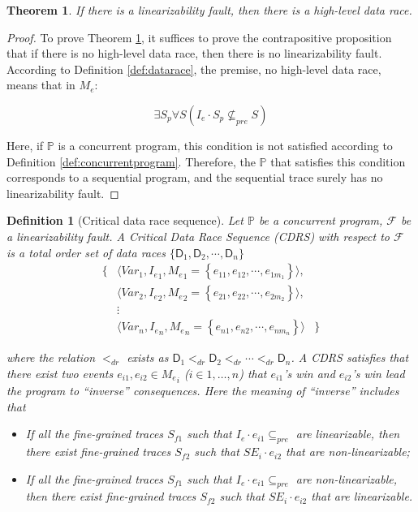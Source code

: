 \documentclass[runningheads]{llncs}
\newcommand{\set}[1]{\left\{{#1}\right\}}
\newcommand{\se}{\mathit{I_e}}
\newcommand{\ce}{\mathit{M_e}}
\newcommand{\dr}{\mathsf{D}}
\newtheorem{myTheo}{Theorem}
\newtheorem{myDef}{Definition}
\begin{document}
\begin{myTheo}\label{theo:datarace}
   If there is a linearizability fault, then there is a high-level data race.
\end{myTheo}

\begin{proof}
To prove Theorem \ref{theo:datarace}, it suffices to prove the contrapositive proposition that if there is no high-level data race, 
then there is no linearizability fault. According to Definition \ref{def:datarace}, the premise, no high-level data race, means that in $\ce$:

$$\exists S_p \forall S ( \se\cdot S_p \nsubseteq_{pre} S)$$

Here, if $\mathbb{P}$ is a concurrent program, this condition is not satisfied according to Definition \ref{def:concurrentprogram}. 
Therefore, the $\mathbb{P}$ that satisfies this condition corresponds to a sequential program, and the sequential trace surely has no linearizability fault.
\end{proof}


\begin{myDef}[Critical data race sequence]\label{def:cdrs}
    Let  $\mathbb{P}$ be a concurrent program, $\mathcal{F}$ be a linearizability fault. A \textit{Critical Data Race Sequence} (\textit{CDRS}) with respect to
 $\mathcal{F}$ is a total order set of data races $\{\mathsf{D}_1,\mathsf{D}_2,\cdots,\mathsf{D}_n\}$
 \[
\begin{array}{ccc}
   \{& \langle\mathit{Var}_1, \se_1, \ce_1 = \set{e_{11},e_{12},\cdots,e_{1m_1}}\rangle, & \\
   & \langle\mathit{Var}_2, \se_2, \ce_2 = \set{e_{21},e_{22},\cdots,e_{2m_2}}\rangle, &\\
   & \vdots& \\
   &\langle \mathit{Var}_n, \se_n, \ce_n = \set{e_{n1},e_{n2},\cdots,e_{nm_n}} \rangle&\}
\end{array}
\]

\noindent where the relation $<_{dr}$ exists as $\mathsf{D}_1 <_{dr} \dr_2 <_{dr} \cdots  <_{dr} \mathsf{D}_n$.
A CDRS satisfies that there exist two events $e_{i1}, e_{i2}\in \ce_i$ ($i\in{1,\dots,n}$)   that $e_{i1}$'s win and
$e_{i2}$'s win lead the program to ``inverse'' consequences. Here the meaning of ``inverse'' includes that
\begin{itemize}
\item If all the fine-grained traces $S_{f1}$ such that $\se\cdot e_{i1} \subseteq_{pre}$ are linearizable, then there exist fine-grained traces $S_{f2}$ such that 
$\mathit{SE_i}\cdot e_{i2}$ that are non-linearizable;
\item If all the fine-grained traces $S_{f1}$ such that $\se\cdot e_{i1} \subseteq_{pre}$ are non-linearizable, then there exist fine-grained traces $S_{f2}$ such that 
$\mathit{SE_i}\cdot e_{i2}$ that are linearizable.\\
\end{itemize}
\end{myDef}
\end{document}
